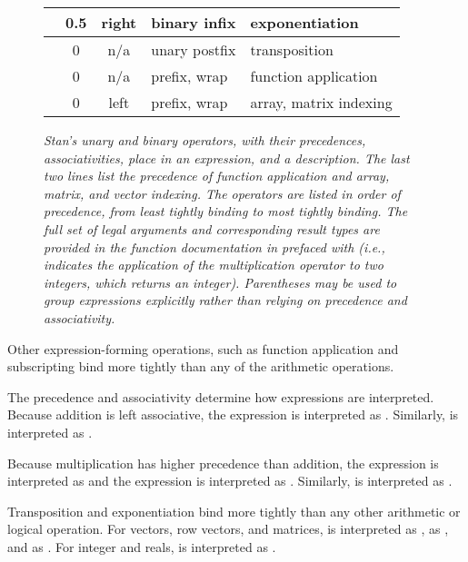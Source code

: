 \begin{figure}
\begin{center}
\begin{tabular}{c|ccl|l}
\code{\textasciicircum} & 0.5 & right & binary infix & exponentiation
\\ \hline
\code{'} & 0 & n/a & unary postfix & transposition
\\ \hline \hline
\code{()} & 0 & n/a & prefix, wrap & function application
\\
\code{[]} & 0 & left & prefix, wrap & array, matrix indexing
\end{tabular}
\end{center}
\caption{\it Stan's unary and binary operators, with their
  precedences, associativities, place in an expression, and a
  description.  The last two lines list the precedence of function
  application and array, matrix, and vector indexing. The operators are
  listed in order of precedence, from least tightly binding to most
  tightly binding.  The full set of legal arguments and corresponding
  result types are provided in the function documentation in
   prefaced with  (i.e.,
   indicates the application of the
  multiplication operator to two integers, which returns an integer).
  Parentheses may be used to group expressions explicitly rather than
  relying on precedence and
  associativity.}\label{operator-precedence.figure}
\end{figure}
%
Other expression-forming operations, such as function application and
subscripting bind more tightly than any of the arithmetic operations.

The precedence and associativity determine how expressions are
interpreted.  Because addition is left associative, the expression
\mbox{} is interpreted as \mbox{}.  Similarly,
\mbox{} is interpreted as \mbox{}.

Because multiplication has higher precedence than addition, the
expression \mbox{} is interpreted as \mbox{} and the
expression \mbox{} is interpreted as \mbox{}.  Similarly,
\mbox{} is interpreted as \mbox{}.

Transposition and exponentiation bind more tightly
than any other arithmetic or logical operation.
For vectors, row vectors, and matrices,
\mbox{} is interpreted as \mbox{}, \mbox{} as
\mbox{}, and \mbox{} as \mbox{}.
For integer and reals,
\mbox{}
is interpreted as \mbox{}.




